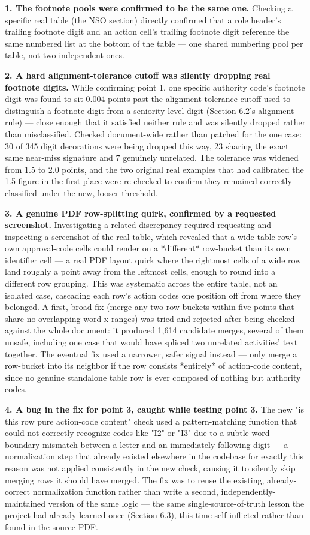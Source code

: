 \textbf{1. The footnote pools were confirmed to be the same one.} Checking a specific real table (the NSO section) directly confirmed that a role header's trailing footnote digit and an action cell's trailing footnote digit reference the same numbered list at the bottom of the table — one shared numbering pool per table, not two independent ones.

\textbf{2. A hard alignment-tolerance cutoff was silently dropping real footnote digits.} While confirming point 1, one specific authority code's footnote digit was found to sit 0.004 points past the alignment-tolerance cutoff used to distinguish a footnote digit from a seniority-level digit (Section 6.2's alignment rule) — close enough that it satisfied neither rule and was silently dropped rather than misclassified. Checked document-wide rather than patched for the one case: 30 of 345 digit decorations were being dropped this way, 23 sharing the exact same near-miss signature and 7 genuinely unrelated. The tolerance was widened from 1.5 to 2.0 points, and the two original real examples that had calibrated the 1.5 figure in the first place were re-checked to confirm they remained correctly classified under the new, looser threshold.

\textbf{3. A genuine PDF row-splitting quirk, confirmed by a requested screenshot.} Investigating a related discrepancy required requesting and inspecting a screenshot of the real table, which revealed that a wide table row's own approval-code cells could render on a *different* row-bucket than its own identifier cell — a real PDF layout quirk where the rightmost cells of a wide row land roughly a point away from the leftmost cells, enough to round into a different row grouping. This was systematic across the entire table, not an isolated case, cascading each row's action codes one position off from where they belonged. A first, broad fix (merge any two row-buckets within five points that share no overlapping word x-ranges) was tried and rejected after being checked against the whole document: it produced 1,614 candidate merges, several of them unsafe, including one case that would have spliced two unrelated activities' text together. The eventual fix used a narrower, safer signal instead — only merge a row-bucket into its neighbor if the row consists *entirely* of action-code content, since no genuine standalone table row is ever composed of nothing but authority codes.

\textbf{4. A bug in the fix for point 3, caught while testing point 3.} The new "is this row pure action-code content" check used a pattern-matching function that could not correctly recognize codes like "I2" or "I3" due to a subtle word-boundary mismatch between a letter and an immediately following digit — a normalization step that already existed elsewhere in the codebase for exactly this reason was not applied consistently in the new check, causing it to silently skip merging rows it should have merged. The fix was to reuse the existing, already-correct normalization function rather than write a second, independently-maintained version of the same logic — the same single-source-of-truth lesson the project had already learned once (Section 6.3), this time self-inflicted rather than found in the source PDF.


